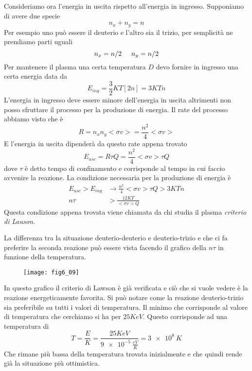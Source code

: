 Consideriamo ora l'energia in uscita rispetto all'energia in ingresso.
Supponiamo di avere due specie
\begin{equation}
n_x+n_y=n
\end{equation}
Per esempio uno può essere il deuterio e l'altro sia il trizio, per semplicità ne prendiamo parti uguali
\begin{equation}
n_x=n/2 \hspace{0.5cm} n_y=n/2
\end{equation}
Per mantenere il plasma una certa temperatura $D$ devo fornire in ingresso una certa energia data da
\begin{equation}
E_{ing}=\frac{3}{2}KT[2n]=3KTn
\end{equation}
L'energia in ingresso deve essere minore dell'energia in uscita altrimenti non posso sfruttare il processo per la produzione di energia.
Il rate del processo abbiamo visto che è
\begin{equation}
R=n_xn_y<\sigma v>=\frac{n^2}{4}<\sigma v>
\end{equation}
E l'energia in uscita dipenderà da questo rate appena trovato
\begin{equation}
E_{usc}=R\tau Q=\frac{n^2}{4}<\sigma v>\tau Q
\end{equation}
dove $\tau$ è detto tempo di confinamento e corrisponde al tempo in cui faccio avvenire la reazione.
La condizione necessaria per la produzione di energia è
\begin{equation}
\begin{split}
E_{usc}>E_{ing}&\to \frac{n^2}{4}<\sigma v>\tau Q > 3KTn\\
n\tau &>\frac{12KT}{<\sigma v> Q} 
\end{split}
\end{equation}
Questa condizione appena trovata viene chiamata da chi studia il plasma \emph{criterio di Lauson}.

La differenza tra la situazione deuterio-deuterio e deuterio-trizio e che ci fa preferire la seconda reazione può essere vista facendo il grafico della $n\tau$ in funzione della temperatura.
\begin{figure}[h]
\centering
\texttt{[image: fig6\_09]}
\end{figure}

In questo grafico il criterio di Lawson è già verificata e ciò che si vuole vedere è la reazione energeticamente favorita. 
Si può notare come la reazione deuterio-trizio sia preferibile su tutti i valori di temperatura.
Il minimo che corrisponde al valore di temperatura che cerchiamo si ha per $25KeV$.
Questo corrisponde ad una temperatura di 
\begin{equation}
T=\frac{E}{K}=\frac{25KeV}{\SI{9e-5}{\frac{eV}{K}}}=\SI{3e8}{K}
\end{equation}
Che rimane più bassa della temperatura trovata inizialmente e che quindi rende già la situazione più ottimistica.

